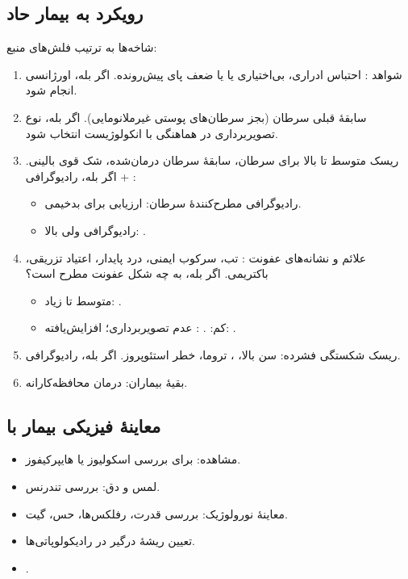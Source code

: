 \documentclass[12pt,a4paper]{article}
\begin{document}
\subsection*{رویکرد به بیمار  حاد}
شاخه‌ها به ترتیب فلش‌های منبع:
\begin{enumerate}
  \item شواهد : احتباس ادراری، بی‌اختیاری یا  یا ضعف پای پیش‌رونده.
  اگر بله،  اورژانسی انجام شود.
  \item سابقهٔ قبلی سرطان (بجز سرطان‌های پوستی غیرملانومایی).
  اگر بله، نوع تصویربرداری در هماهنگی با انکولوژیست انتخاب شود.
  \item ریسک متوسط تا بالا برای سرطان، سابقهٔ سرطان درمان‌شده، شک قوی بالینی.
  اگر بله، رادیوگرافی + :
  \begin{itemize}
    \item رادیوگرافی مطرح‌کنندهٔ سرطان: ارزیابی برای بدخیمی.
    \item رادیوگرافی  ولی  بالا: .
  \end{itemize}
  \item علائم و نشانه‌های عفونت : تب، سرکوب ایمنی، درد پایدار، اعتیاد تزریقی، باکتریمی.
  اگر بله، به چه شکل عفونت  مطرح است؟
  \begin{itemize}
    \item متوسط تا زیاد: .
    \item کم: .
    : عدم تصویربرداری؛ افزایش‌یافته: .
  \end{itemize}
  \item ریسک شکستگی فشرده: سن بالا، ، تروما، خطر استئوپروز.
  اگر بله، رادیوگرافی.
  \item بقیهٔ بیماران: درمان محافظه‌کارانه.
\end{enumerate}

\subsection*{معاینهٔ فیزیکی بیمار با }
\begin{itemize}
  \item مشاهده: برای بررسی اسکولیوز یا هایپرکیفوز.
  \item لمس و دق: بررسی تندرنس.
  \item معاینهٔ نورولوژیک: بررسی قدرت، رفلکس‌ها، حس، گیت.
  \item تعیین ریشهٔ درگیر در رادیکولوپاتی‌ها.
  \item {}.
\end{itemize}
\end{document}
